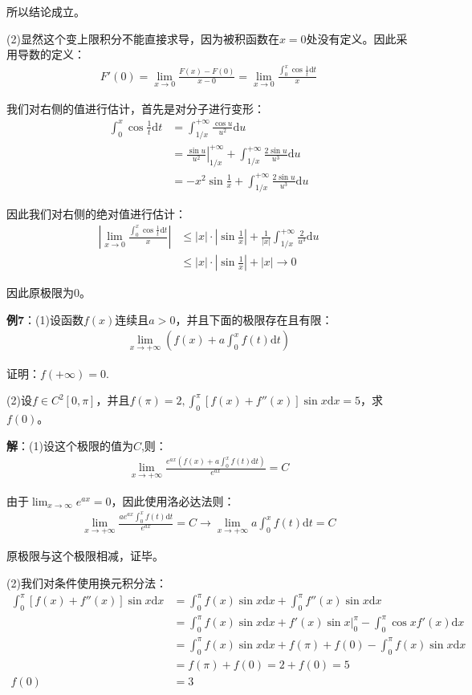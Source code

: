 \documentclass{ctexart}
\let\oldtextbf\textbf %
\renewcommand{\textbf}[1]{\textcolor{btex}{\oldtextbf{#1}}} %
\begin{document}
所以结论成立。

(2)显然这个变上限积分不能直接求导，因为被积函数在$x=0$处没有定义。因此采用导数的定义：
\begin{align*}
    F'(0)=\lim_{x\to 0}\frac{F(x)-F(0)}{x-0}=\lim_{x\to 0}\frac{\int_0^x\cos\frac{1}{t}\mathrm{d}t}{x}
\end{align*}

我们对右侧的值进行估计，首先是对分子进行变形：
\begin{align*}
\int_0^x\cos\frac{1}{t}\mathrm{d}t&=\int_{1/x}^{+\infty}\frac{\cos u}{u^2}\mathrm{d}u\\
&=\left.\frac{\sin u}{u^2} \right|_{1/x}^{+\infty}+\int_{1/x}^{+\infty}\frac{2\sin u}{u^3}\mathrm{d}u\\
&=-x^2\sin\frac{1}{x}+ \int_{1/x}^{+\infty}\frac{2\sin u}{u^3}\mathrm{d}u     
\end{align*} 

因此我们对右侧的绝对值进行估计：
\begin{align*}
\left|\lim_{x\to 0}\frac{\int_0^x\cos\frac{1}{t}\mathrm{d}t}{x}\right|&\leq |x|\cdot|\sin\frac{1}{x}|
+\frac{1}{|x|}\int_{1/x}^{+\infty}\frac{2}{u^3}\mathrm{d}u\\
&\leq    |x|\cdot|\sin \frac{1}{x} |+|x|\to 0
\end{align*} 

因此原极限为0。

\textbf{例7}：(1)设函数$f(x)$连续且$a>0$，并且下面的极限存在且有限：
\begin{align*}
    \lim_{x\to+\infty}\left(f(x)+a\int_0^x f(t)\mathrm{d}t\right)
\end{align*}

证明：$f(+\infty)=0$.


(2)设$f\in C^2[0,\pi]$，并且$f(\pi)=2,\int_0^\pi[f(x)+f''(x)]\sin x\mathrm{d}x=5$，求$f(0)$。

\textbf{解}：(1)设这个极限的值为$C$,则：
\begin{align*}
    \lim_{x\to+\infty}\frac{e^{ax}\left(f(x)+a\int_0^x f(t)\mathrm{d}t\right)}{e^{ax}}=C
\end{align*}

由于$\lim_{x\to\infty}e^{ax}=0$，因此使用洛必达法则：
\begin{align*}
    \lim_{x\to+\infty}\frac{ae^{ax}\int_0^x f(t)\mathrm{d}t}{e^{ax}}=C\to \lim_{x\to+\infty}a\int_0^xf(t)\mathrm{d}t=C 
\end{align*}

原极限与这个极限相减，证毕。

(2)我们对条件使用换元积分法：
\begin{align*}
    \int_0^\pi[f(x)+f''(x)]\sin x\mathrm{d}x&=\int_0^\pi f(x)\sin x\mathrm{d}x +
\int_0^\pi f''(x)\sin x\mathrm{d}x\\
&=\int_0^\pi f(x)\sin x\mathrm{d}x+f'(x)\sin x|_0^\pi-\int_0^\pi \cos xf'(x)\mathrm{d}x\\
&=\int_0^\pi f(x)\sin x\mathrm{d}x+f(\pi)+f(0)- \int_0^\pi f(x)\sin x\mathrm{d}x\\
&=f(\pi) +f(0)=2+f(0)=5\\
f(0)&=3
\end{align*}
\end{document}
